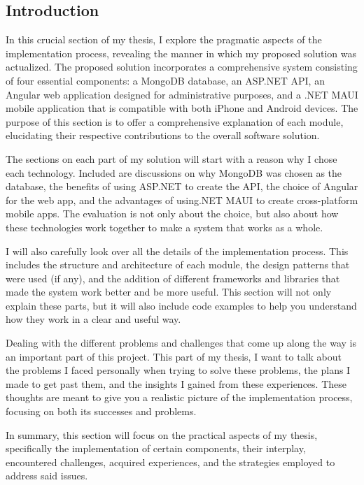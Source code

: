 \subsection{Introduction}

In this crucial section of my thesis, I explore the pragmatic aspects of the implementation process, revealing the manner in which my proposed solution was actualized. The proposed solution incorporates a comprehensive system consisting of four essential components: a MongoDB database, an ASP.NET API, an Angular web application designed for administrative purposes, and a .NET MAUI mobile application that is compatible with both iPhone and Android devices. The purpose of this section is to offer a comprehensive explanation of each module, elucidating their respective contributions to the overall software solution.

The sections on each part of my solution will start with a reason why I chose each technology. Included are discussions on why MongoDB was chosen as the database, the benefits of using ASP.NET to create the API, the choice of Angular for the web app, and the advantages of using.NET MAUI to create cross-platform mobile apps. The evaluation is not only about the choice, but also about how these technologies work together to make a system that works as a whole.

I will also carefully look over all the details of the implementation process. This includes the structure and architecture of each module, the design patterns that were used (if any), and the addition of different frameworks and libraries that made the system work better and be more useful. This section will not only explain these parts, but it will also include code examples to help you understand how they work in a clear and useful way.

Dealing with the different problems and challenges that come up along the way is an important part of this project. This part of my thesis, I want to talk about the problems I faced personally when trying to solve these problems, the plans I made to get past them, and the insights I gained from these experiences. These thoughts are meant to give you a realistic picture of the implementation process, focusing on both its successes and problems.

In summary, this section will focus on the practical aspects of my thesis, specifically the implementation of certain components, their interplay, encountered challenges, acquired experiences, and the strategies employed to address said issues.

